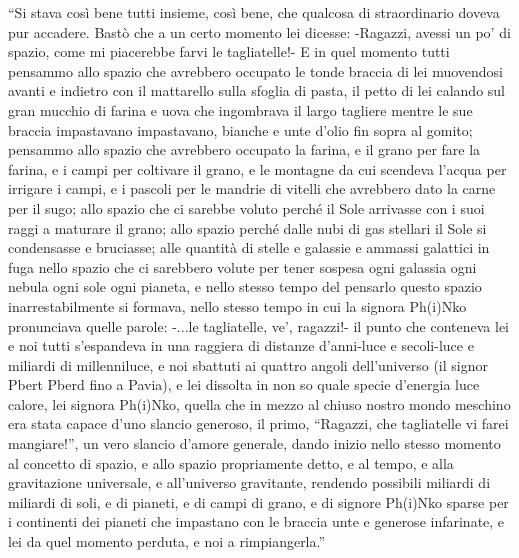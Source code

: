 \begin{acknowledgements}
{\footnotesize\textsf{``Si stava così bene tutti insieme, così bene, che qualcosa di straordinario doveva pur accadere.
Bastò che a un certo momento lei dicesse: -Ragazzi, avessi un po’ di spazio, come mi piacerebbe
farvi le tagliatelle!- E in quel momento tutti pensammo allo spazio che avrebbero occupato le
tonde braccia di lei muovendosi avanti e indietro con il mattarello sulla sfoglia di pasta, il petto
di lei calando sul gran mucchio di farina e uova che ingombrava il largo tagliere mentre le sue
braccia impastavano impastavano, bianche e unte d’olio fin sopra al gomito; pensammo allo
spazio che avrebbero occupato la farina, e il grano per fare la farina, e i campi per coltivare il
grano, e le montagne da cui scendeva l’acqua per irrigare i campi, e i pascoli per le mandrie di
vitelli che avrebbero dato la carne per il sugo; allo spazio che ci sarebbe voluto perché il Sole
arrivasse con i suoi raggi a maturare il grano; allo spazio perché dalle nubi di gas stellari il Sole si
condensasse e bruciasse; alle quantità di stelle e galassie e ammassi galattici in fuga nello spazio
che ci sarebbero volute per tener sospesa ogni galassia ogni nebula ogni sole ogni pianeta, e nello
stesso tempo del pensarlo questo spazio inarrestabilmente si formava, nello stesso tempo in cui la
signora Ph(i)Nko pronunciava quelle parole: -...le tagliatelle, ve’, ragazzi!- il punto che conteneva
lei e noi tutti s’espandeva in una raggiera di distanze d’anni-luce e secoli-luce e miliardi di millenniluce,
e noi sbattuti ai quattro angoli dell’universo (il signor Pbert Pberd fino a Pavia), e lei dissolta
in non so quale specie d’energia luce calore, lei signora Ph(i)Nko, quella che in mezzo al chiuso
nostro mondo meschino era stata capace d’uno slancio generoso, il primo, “Ragazzi, che tagliatelle
vi farei mangiare!”, un vero slancio d’amore generale, dando inizio nello stesso momento al
concetto di spazio, e allo spazio propriamente detto, e al tempo, e alla gravitazione universale, e
all’universo gravitante, rendendo possibili miliardi di miliardi di soli, e di pianeti, e di campi di
grano, e di signore Ph(i)Nko sparse per i continenti dei pianeti che impastano con le braccia unte
e generose infarinate, e lei da quel momento perduta, e noi a
rimpiangerla.''}

}
\end{acknowledgements}
